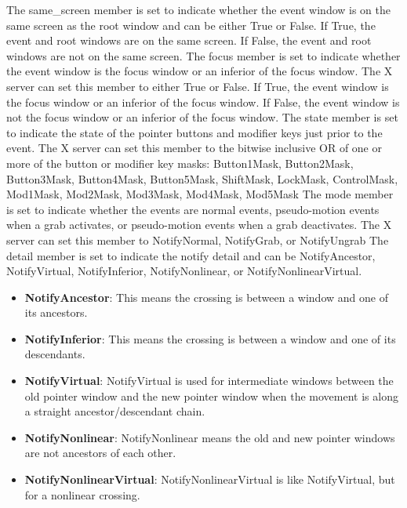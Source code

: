 \documentclass{report}
\begin{document}
\begin{itemize}
            \bigbreak \noindent 
            The same\_screen member is set to indicate whether the event window is on the same screen as the root window and can be either True or False. If True, the event and root windows are on the same screen. If False, the event and root windows are not on the same screen.
            \bigbreak \noindent 
            The focus member is set to indicate whether the event window is the focus window or an inferior of the focus window. The X server can set this member to either True or False. If True, the event window is the focus window or an inferior of the focus window. If False, the event window is not the focus window or an inferior of the focus window.
            \bigbreak \noindent 
            The state member is set to indicate the state of the pointer buttons and modifier keys just prior to the event. The X server can set this member to the bitwise inclusive OR of one or more of the button or modifier key masks: Button1Mask, Button2Mask, Button3Mask, Button4Mask, Button5Mask, ShiftMask, LockMask, ControlMask, Mod1Mask, Mod2Mask, Mod3Mask, Mod4Mask, Mod5Mask
            \bigbreak \noindent 
            The mode member is set to indicate whether the events are normal events, pseudo-motion events when a grab activates, or pseudo-motion events when a grab deactivates. The X server can set this member to NotifyNormal, NotifyGrab, or NotifyUngrab
            \bigbreak \noindent 
            The detail member is set to indicate the notify detail and can be NotifyAncestor, NotifyVirtual, NotifyInferior, NotifyNonlinear, or NotifyNonlinearVirtual.
            \begin{itemize}
                \item \textbf{NotifyAncestor}: This means the crossing is between a window and one of its ancestors. 
                \item \textbf{NotifyInferior}: This means the crossing is between a window and one of its descendants.
                \item \textbf{NotifyVirtual}: NotifyVirtual is used for intermediate windows between the old pointer window and the new pointer window when the movement is along a straight ancestor/descendant chain.
                \item \textbf{NotifyNonlinear}: NotifyNonlinear means the old and new pointer windows are not ancestors of each other.
                \item \textbf{NotifyNonlinearVirtual}: NotifyNonlinearVirtual is like NotifyVirtual, but for a nonlinear crossing.
            \end{itemize}

\end{itemize}
\end{document}
